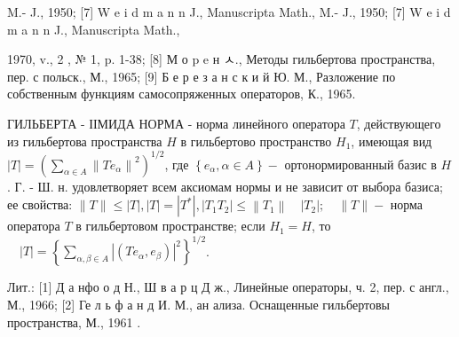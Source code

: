 \documentclass[10pt]{article}
\begin{document}
M.- J., 1950; [7] W e i d m a n n J., Manuscripta Math., M.- J., 1950; [7] W e i d m a n n J., Manuscripta Math.,

1970, v., 2 , № 1, p. 1-38; [8] М о p e н ㅅ., Методы гильбертова пространства, пер. с польск., М., 1965; [9] Б е р е з а н с к и й Ю. М., Разложение по собственным функциям самосопряженных операторов, К., 1965.



ГИЛЬБЕРТА - ІІМИДА НОРМА - норма линейного оператора $T$, действующего из гильбертова пространства $H$ в гильбертово пространство $H_{1}$, имеющая вид $|T|=\left(\sum_{\alpha \in A}\left\|T e_{\alpha}\right\|^{2}\right)^{1 / 2}$, где $\left\{e_{\alpha}, \alpha \in A\right\}-$ ортонормированный базис в $H$. Г. - Ш. н. удовлетворяет всем аксиомам нормы и не зависит от выбора базиса; ее свойства: $\|T\| \leqslant|T|,|T|=\left|T^{*}\right|,\left|T_{1} T_{2}\right| \leqslant\left\|T_{1}\right\| \quad\left|T_{2}\right| ; \quad\|T\|-$ норма оператора $T$ в гильбертовом пространстве; если $H_{1}=H$, то $\quad|T|=\left\{\sum_{\alpha, \beta \in A}\left|\left(T e_{\alpha}, e_{\beta}\right)\right|^{2}\right\}^{1 / 2}$.



Лит.: [1] Д а нфо о д Н., Ш в а р ц Д ж., Линейные операторы, ч. 2, пер. с англ., М., 1966; [2] Ге л ь ф а н д И. М., ан ализа. Оснащенные гильбертовы пространства, М., 1961 .
\end{document}
